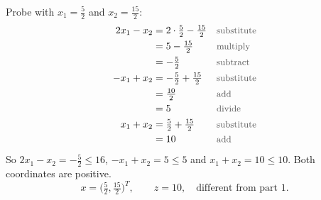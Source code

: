 \documentclass[a4paper,11pt]{article}
\newif\ifexplain
\newcommand{\why}[1]{\text{\small\color{black!65}#1}}
\newcommand{\explain}[1]{\ifexplain\begin{erklbox}#1\end{erklbox}\fi}
\begin{document}
\explain{Der andere erste Pivot läuft zuerst die $x_2$-Achse hinauf bis $(0,5)$ und dann entlang $-x_1+x_2=5$ bis zur dritten Nebenbedingung. Wieder ist $z=10$, aber die Koordinaten sind andere. Genau das verlangt Teil 2: nicht eine andere Basis desselben Punkts, sondern ein anderer Punkt. Nicht dieselbe Ecke.}
Probe with $x_1=\tfrac52$ and $x_2=\tfrac{15}{2}$:
\begin{align*}
2x_1-x_2&=2\cdot\tfrac52-\tfrac{15}{2}&&\why{substitute}\\
&=5-\tfrac{15}{2}&&\why{multiply}\\
&=-\tfrac52&&\why{subtract}\\
-x_1+x_2&=-\tfrac52+\tfrac{15}{2}&&\why{substitute}\\
&=\tfrac{10}{2}&&\why{add}\\
&=5&&\why{divide}\\
x_1+x_2&=\tfrac52+\tfrac{15}{2}&&\why{substitute}\\
&=10&&\why{add}
\end{align*}
So $2x_1-x_2=-\tfrac52\leq 16$, $-x_1+x_2=5\leq 5$ and $x_1+x_2=10\leq 10$. Both coordinates are positive.
\[\boxed{x=\bigl(\tfrac52,\tfrac{15}{2}\bigr)^T,\qquad z=10,\quad\text{different from part 1.}}\]
\end{document}

